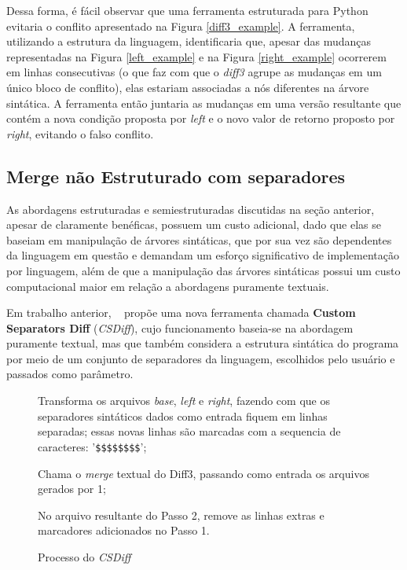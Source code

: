 Dessa forma, é fácil observar que uma ferramenta estruturada para Python evitaria o
conflito apresentado na Figura \ref{diff3_example}. A ferramenta, utilizando a estrutura da
linguagem, identificaria que, apesar das mudanças representadas na Figura \ref{left_example} e na
Figura \ref{right_example} ocorrerem em linhas consecutivas (o que faz com que o \emph{diff3}
agrupe as mudanças em um único bloco de conflito),
elas estariam associadas a nós diferentes na árvore
sintática. A ferramenta então juntaria as mudanças em uma versão resultante que contém a
nova condição proposta por \emph{left} e o novo valor de retorno proposto por \emph{right},
evitando o falso conflito.

\subsection{Merge não Estruturado com separadores}
As abordagens estruturadas e semiestruturadas discutidas na seção anterior, apesar de claramente benéficas,
possuem um custo adicional, dado que elas se baseiam em manipulação de árvores sintáticas, que por sua vez são
dependentes da linguagem em questão e demandam um esforço significativo de implementação por linguagem, além de que
a manipulação das árvores sintáticas possui um custo computacional maior em relação a abordagens puramente textuais.

Em trabalho anterior, ~\citeauthor{clem21} propõe uma nova ferramenta chamada
\textbf{Custom Separators Diff} (\emph{CSDiff}), cujo funcionamento baseia-se na abordagem puramente textual, mas que também
considera a estrutura sintática do programa por meio de um conjunto de separadores da linguagem, escolhidos pelo usuário e
passados como parâmetro.

\begin{figure}[ht]
	\begin{center}
		\begin{compactenum}[(1)]
			\item Transforma os arquivos \emph{base}, \emph{left} e \emph{right}, fazendo com que os separadores sintáticos
			dados como entrada fiquem em linhas separadas; essas novas linhas são marcadas com a sequencia de caracteres:
			'\verb|$$$$$$$$|';
			\item Chama o \emph{merge} textual do Diff3, passando como entrada os arquivos gerados por 1;
			\item No arquivo resultante do Passo 2, remove as linhas extras e marcadores adicionados no Passo 1.
		\end{compactenum}
	\end{center}
	\caption{Processo do \emph{CSDiff}}\label{csdiff_process}
\end{figure}


